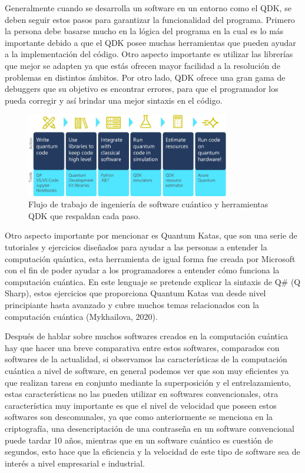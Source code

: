 \documentclass{article}
\begin{document}
Generalmente cuando se desarrolla un software en un entorno como el QDK, se deben seguir estos pasos para garantizar la funcionalidad del programa. Primero la persona debe basarse mucho en la lógica del programa en la cual es lo más importante debido a que el QDK posee muchas herramientas que pueden ayudar a la implementación del código. Otro aspecto importante es utilizar las librerías que mejor se adapten ya que estás ofrecen mayor facilidad a la resolución de problemas en distintos ámbitos. Por otro lado, QDK ofrece una gran gama de debuggers que su objetivo es encontrar errores, para que el programador los pueda corregir y así brindar una mejor sintaxis en el código.  


\begin{figure}[htb]
    \centering
    \includegraphics[width=3.5in]{QDK.jpg}
    \caption{Flujo de trabajo de ingeniería de software cuántico y herramientas QDK que respaldan cada paso.}
    \label{fig:quantum}
\end{figure}

Otro aspecto importante por mencionar es Quantum Katas, que son una serie de tutoriales y ejercicios diseñados para ayudar a las personas a entender la computación quántica, esta herramienta de igual forma fue creada por Microsoft con el fin de poder ayudar a los programadores a entender cómo funciona la computación cuántica. En este lenguaje se pretende explicar la sintaxis de Q\# (Q Sharp), estos ejercicios que proporciona Quantum Katas van desde nivel principiante hasta avanzado y cubre muchos temas relacionados con la computación cuántica (Mykhailova, 2020).

Después de hablar sobre muchos softwares creados en la computación cuántica hay que hacer una breve comparativa entre estos softwares, comparados con softwares de la actualidad, si observamos las características de la computación cuántica a nivel de software, en general podemos ver que son muy eficientes ya que realizan tareas en conjunto mediante la superposición y el entrelazamiento, estas características no las pueden utilizar en softwares convencionales, otra característica muy importante es que el nivel de velocidad que poseen estos softwares son descomunales, ya que como anteriormente se menciona en la criptografía, una desencriptación de una contraseña en un software convencional puede tardar 10 años, mientras que en un software cuántico es cuestión de segundos, esto hace que la eficiencia y la velocidad de este tipo de software sea de interés a nivel empresarial e industrial. 
\end{document}
